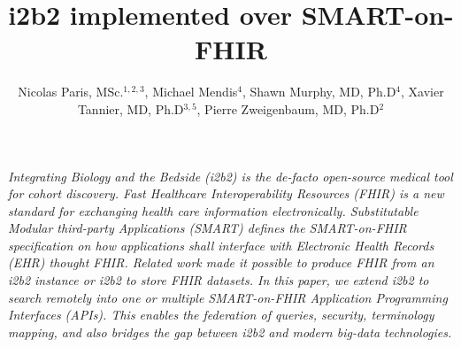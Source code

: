 \documentclass{amia}
\begin{document}
\title{i2b2 implemented over SMART-on-FHIR} 
\author{Nicolas Paris, MSc.$^{1,2,3}$, Michael Mendis$^{4}$, Shawn Murphy, MD, Ph.D$^{4}$, Xavier Tannier, MD, Ph.D$^{3,5}$, Pierre Zweigenbaum, MD, Ph.D$^{2}$
}


\maketitle


\textit{Integrating Biology and the Bedside (i2b2) is the de-facto open-source medical tool for cohort discovery. Fast Healthcare Interoperability Resources (FHIR) is a new standard for exchanging health care information electronically. Substitutable Modular third-party Applications (SMART) defines the SMART-on-FHIR specification on how applications shall interface with  Electronic Health Records (EHR) thought FHIR. Related work made it possible to produce FHIR from an i2b2 instance or i2b2 to store FHIR datasets. In this paper, we extend i2b2 to search remotely into one or multiple SMART-on-FHIR Application Programming Interfaces (APIs). This enables the federation of queries, security, terminology mapping, and also bridges the gap between i2b2 and modern big-data technologies.}
\end{document}
